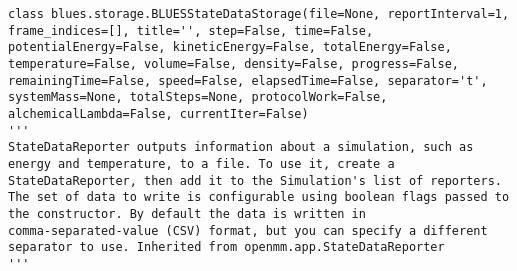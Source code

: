 \begin{description}
\begin{verbatim}
class blues.storage.BLUESStateDataStorage(file=None, reportInterval=1, frame_indices=[], title='', step=False, time=False, potentialEnergy=False, kineticEnergy=False, totalEnergy=False, temperature=False, volume=False, density=False, progress=False, remainingTime=False, speed=False, elapsedTime=False, separator='t', systemMass=None, totalSteps=None, protocolWork=False, alchemicalLambda=False, currentIter=False)
'''
StateDataReporter outputs information about a simulation, such as
energy and temperature, to a file. To use it, create a 
StateDataReporter, then add it to the Simulation's list of reporters.
The set of data to write is configurable using boolean flags passed to
the constructor. By default the data is written in 
comma-separated-value (CSV) format, but you can specify a different 
separator to use. Inherited from openmm.app.StateDataReporter
'''
\end{verbatim}


\end{description}
